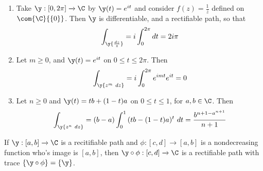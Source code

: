 \begin{example}\label{example_4.1}
    \begin{enumerate}
        \item[(1)] Take $\y:[0,2\pi] \xrightarrow{} \C$ by $\y(t)=e^{it}$ and
            consider $f(z)=\frac{1}{z}$ defined on $\com{\C}{\{0\}}$. Then $\y$
            is differentiable, and a rectifiable path, so that
            \begin{equation*}
                \int_\y{\frac{dz}{z}}=i\int_0^{2\pi}{dt}=2i\pi
            \end{equation*}

        \item[(2)] Let $m \geq 0$, and  $\y(t)=e^{it}$ on $0 \leq t \leq 2\pi$.
            Then
            \begin{equation*}
                \int_\y{z^m \ dz}=i\int_0^{2\pi}{e^{imt}e^{it}}=0
            \end{equation*}

        \item[(3)] Let $n \geq 0$ and $\y(t)=tb+(1-t)a$ on $0 \leq t \leq 1$,
            for $a,b \in \C$. Then
            \begin{equation*}
                \int_\y{z^n \ dz}=(b-a)\int_0^1{(tb-(1-t)a)^t \ dt}=
                \frac{b^{n+1-a^{n+1}}}{n+1}
            \end{equation*}
    \end{enumerate}
\end{example}

\begin{lemma}\label{4.2.1}
    If $\y:[a,b] \xrightarrow{} \C$ is a recitifiable path and $\phi:[c,d]
    \xrightarrow{} [a,b]$ is a nondecreasing function who's image is $[a,b]$,
    then $\y \circ \phi:[c,d] \xrightarrow{} \C$ is a rectifiable path with
    trace $\{\y \circ \phi\}=\{\y\}$.
\end{lemma}

